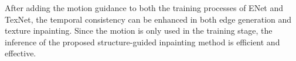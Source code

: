 After adding the motion guidance to both the training processes of ENet and TexNet, the temporal consistency can be enhanced in both edge generation and texture inpainting.
Since the motion is only used in the training stage, the inference of the proposed structure-guided inpainting method is efficient and effective.
 






	